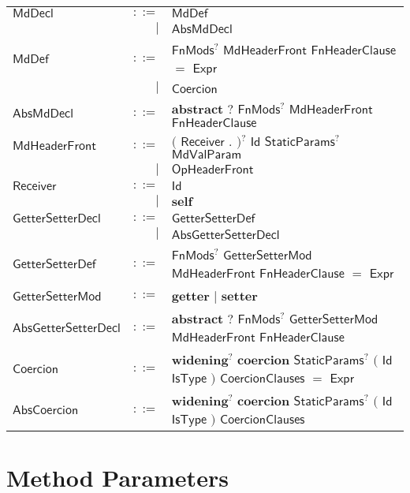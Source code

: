  
\begin{longtable}[l]{p{3cm}rl}
$\mathsf{MdDecl}$ &  $\mathsf{::=}$  & $\mathsf{MdDef}$ \\
 & $\big|$ &  $\mathsf{AbsMdDecl}$ \\
$\mathsf{MdDef}$ &  $\mathsf{::=}$  & $\mathsf{FnMods}$$^?$ $\mathsf{MdHeaderFront}$ $\mathsf{FnHeaderClause}$ $\mathbf{=}$ $\mathsf{Expr}$ \\
 & $\big|$ &  $\mathsf{Coercion}$ \\
$\mathsf{AbsMdDecl}$ &  $\mathsf{::=}$  & $\mathbf{abstract}$ $\mathbf{?}$ $\mathsf{FnMods}$$^?$ $\mathsf{MdHeaderFront}$ $\mathsf{FnHeaderClause}$ \\
$\mathsf{MdHeaderFront}$ &  $\mathsf{::=}$  & $\big($  $\mathsf{Receiver}$ $\mathbf{.}$ $\big)$$^?$ $\mathsf{Id}$ $\mathsf{StaticParams}$$^?$ $\mathsf{MdValParam}$ \\
 & $\big|$ &  $\mathsf{OpHeaderFront}$ \\
$\mathsf{Receiver}$ &  $\mathsf{::=}$  & $\mathsf{Id}$ \\
 & $\big|$ &  $\mathbf{self}$ \\
$\mathsf{GetterSetterDecl}$ &  $\mathsf{::=}$  & $\mathsf{GetterSetterDef}$ \\
 & $\big|$ &  $\mathsf{AbsGetterSetterDecl}$ \\
$\mathsf{GetterSetterDef}$ &  $\mathsf{::=}$  & $\mathsf{FnMods}$$^?$ $\mathsf{GetterSetterMod}$ $\mathsf{MdHeaderFront}$ $\mathsf{FnHeaderClause}$ $\mathbf{=}$ $\mathsf{Expr}$ \\
$\mathsf{GetterSetterMod}$ &  $\mathsf{::=}$  & $\mathbf{getter}$ $\big|$ $\mathbf{setter}$ \\
$\mathsf{AbsGetterSetterDecl}$ &  $\mathsf{::=}$  & $\mathbf{abstract}$ $\mathbf{?}$ $\mathsf{FnMods}$$^?$ $\mathsf{GetterSetterMod}$ $\mathsf{MdHeaderFront}$ $\mathsf{FnHeaderClause}$ \\
$\mathsf{Coercion}$ &  $\mathsf{::=}$  & $\mathbf{widening}$$^?$ $\mathbf{coercion}$ $\mathsf{StaticParams}$$^?$ $\mathbf{(}$ $\mathsf{Id}$ $\mathsf{IsType}$ $\mathbf{)}$ $\mathsf{CoercionClauses}$ $\mathbf{=}$ $\mathsf{Expr}$ \\
$\mathsf{AbsCoercion}$ &  $\mathsf{::=}$  & $\mathbf{widening}$$^?$ $\mathbf{coercion}$ $\mathsf{StaticParams}$$^?$ $\mathbf{(}$ $\mathsf{Id}$ $\mathsf{IsType}$ $\mathbf{)}$ $\mathsf{CoercionClauses}$ \\
\end{longtable} \hfill 

\section{Method Parameters} 

